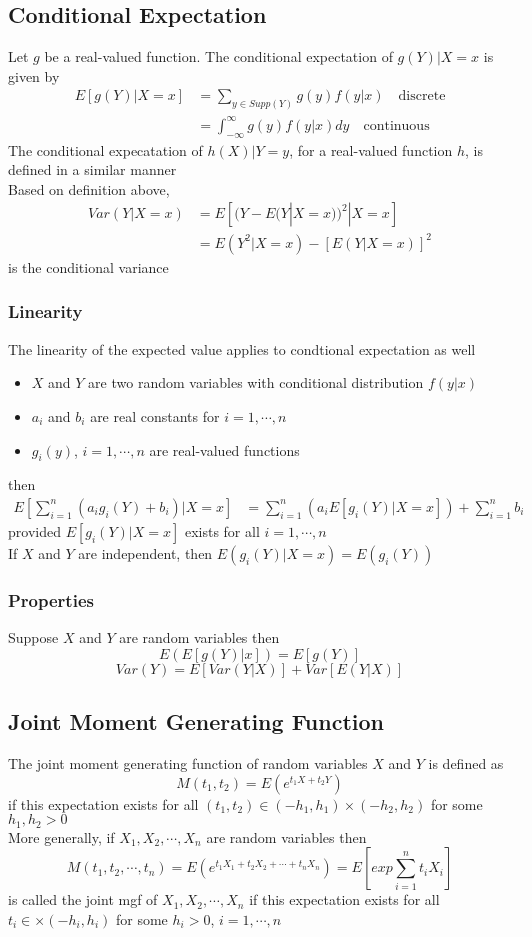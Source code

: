 \documentclass[11pt]{article}
\begin{document}
\subsection{Conditional Expectation}
Let $g$ be a real-valued function. The conditional expectation of $g(Y)|X=x$ is given by 
\begin{align*}
    E[g(Y)|X=x] &= \sum_{y\in Supp(Y)}g(y)f(y|x)\quad\text{discrete} \\
                &= \int_{-\infty}^{\infty}g(y)f(y|x)dy\quad\text{continuous}
\end{align*} 
The conditional expecatation of $h(X)|Y=y$, for a real-valued function $h$, is defined in a similar manner \\
Based on definition above, 
\begin{align*}
    Var(Y|X=x) &= E[(Y-E(Y|X=x))^2|X=x] \\
               &= E(Y^2|X=x)-[E(Y|X=x)]^2
\end{align*}
is the conditional variance 
\subsubsection{Linearity}
The linearity of the expected value applies to condtional expectation as well 
\begin{itemize}
    \item $X$ and $Y$ are two random variables with conditional distribution $f(y|x)$
    \item $a_i$ and $b_i$ are real constants for $i=1,\cdots,n$
    \item $g_i(y)$, $i=1,\cdots,n$ are real-valued functions
\end{itemize}
then 
\begin{align*}
    E[\sum_{i=1}^{n}(a_ig_i(Y)+b_i)|X=x] &= \sum_{i=1}^{n}(a_iE[g_i(Y)|X=x]) + \sum_{i=1}^{n}b_i
\end{align*}
provided $E[g_i(Y)|X=x]$ exists for all $i=1,\cdots,n$ \\
If $X$ and $Y$ are independent, then $E(g_i(Y)|X=x)=E(g_i(Y))$
\subsubsection*{Properties}
Suppose $X$ and $Y$ are random variables then 
\[E(E[g(Y)|x]) = E[g(Y)]\]
\[Var(Y) = E[Var(Y|X)] + Var[E(Y|X)]\]
\subsection{Joint Moment Generating Function}
The joint moment generating function of random variables $X$ and $Y$ is defined as
\[M(t_1,t_2)=E(e^{t_1X+t_2Y})\]
if this expectation exists for all $(t_1,t_2)\in(-h_1,h_1)\times(-h_2,h_2)$ for some $h_1,h_2>0$ \\
More generally, if $X_1,X_2,\cdots,X_n$ are random variables then
\[M(t_1,t_2,\cdots,t_n)=E(e^{t_1X_1+t_2X_2+\cdots+t_nX_n})=E[exp\sum_{i=1}^{n}t_iX_i]\]
is called the joint mgf of $X_1,X_2,\cdots,X_n$ if this expectation exists for all $t_i\in\times(-h_i,h_i)$ for some $h_i>0$, $i=1,\cdots,n$
\end{document}
